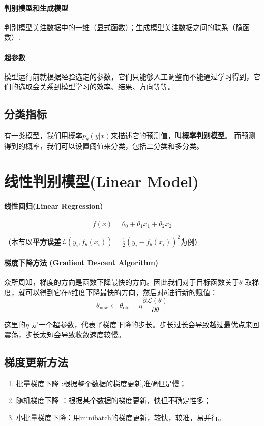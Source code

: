 \paragraph{判别模型和生成模型} 判别模型关注数据中的一维（显式函数）；生成模型关注数据之间的联系（隐函数）.

\paragraph{超参数} 模型运行前就根据经验选定的参数，它们只能够人工调整而不能通过学习得到，它们的选取会关系到模型学习的效率、结果、方向等等。
\subsection{分类指标}
有一类模型，我们用概率$p_\theta(y|x)$来描述它的预测值，叫\textbf{概率判别模型}。
而预测得到的概率，我们可以设置阈值来分类，包括二分类和多分类。





\section{线性判别模型(Linear Model)}
\paragraph{线性回归(Linear Regression)}
$$f(x) = \theta_0 + \theta_1x_1 + \theta_2x_2$$

（本节以\textbf{平方误差}$\mathcal L(y_i,f_\theta(x_i)) = \frac{1}{2}(y_i-f_\theta(x_i))^2$为例）

\paragraph{梯度下降方法 (Gradient Descent Algorithm)}
众所周知，梯度的方向是函数下降最快的方向。因此我们对于目标函数关于$\theta$ 取梯度，就可以得到它在$\theta$维度下降最快的方向，然后对$\theta$进行新的赋值：
$$\theta_\text{new} \leftarrow \theta_\text{old} - \eta\frac{\partial \mathcal L(\theta)}{\partial \theta}$$

这里的$\eta$ 是一个超参数，代表了梯度下降的步长。步长过长会导致越过最优点来回震荡，步长太短会导致收敛速度较慢。

\subsection{梯度更新方法}

\begin{enumerate}
  \item 批量梯度下降 :根据整个数据的梯度更新,准确但是慢；
  \item 随机梯度下降 ：根据某个数据的梯度更新，快但不确定性多；
  \item 小批量梯度下降：用minibatch的梯度更新，较快，较准，易并行。
\end{enumerate}

